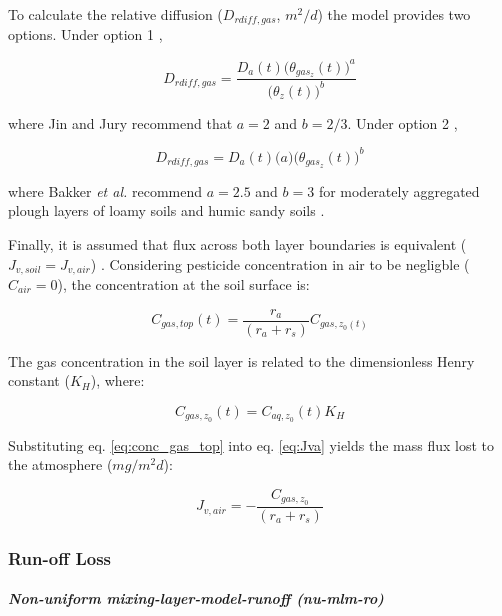 \documentclass[]{article}
\let\oldparagraph\paragraph
\renewcommand{\paragraph}[1]{\oldparagraph{#1}\mbox{}}
\begin{document}
To calculate the relative diffusion (\(D_{rdiff,gas}\), \(m^2/d\)) the
model provides two options. Under option 1 \citep{Millington1960},

\begin{equation}
D_{rdiff,gas} = \frac{ D_a(t) \Big(\theta_{gas_z}(t)\Big)^a}{ \Big(\theta_z(t) \Big)^b }
\label{eq:d_rdiff1}
\end{equation}

where Jin and Jury \citeyearpar{Jin1996} recommend that \(a=2\) and
\(b=2/3\). Under option 2 \citep{Currie1960},

\begin{equation}
D_{rdiff,gas} = D_a(t) \Big(a\Big) \Big( \theta_{gas_z}(t)  \Big)^b
\label{eq:d_rdiff2}
\end{equation}

where Bakker \textit{et al.} \citeyearpar{Bakker1987} recommend
\(a=2.5\) and \(b=3\) for moderately aggregated plough layers of loamy
soils and humic sandy soils \citep{Leistra2001}.

Finally, it is assumed that flux across both layer boundaries is
equivalent (\(J_{v,soil} = J_{v,air}\)) \citep{Leistra2001}. Considering
pesticide concentration in air to be negligble (\(C_{air} = 0\)), the
concentration at the soil surface is:

\begin{equation}
C_{gas,top}(t) = \frac{r_a}{(r_a + r_s)} C_{gas,z_{0}(t)}
\label{eq:conc_gas_top}
\end{equation}

The gas concentration in the soil layer is related to the dimensionless
Henry constant (\(K_H\)), where:

\begin{equation}
C_{gas,z_0}(t) = C_{aq,z_0}(t) K_H  
\label{eq:henry}
\end{equation}

Substituting eq. \ref{eq:conc_gas_top} into eq. \ref{eq:Jva} yields the
mass flux lost to the atmosphere (\(mg/m^2d\)):

\begin{equation}
J_{v,air} = - \frac{C_{gas,z_0}}{(r_a + r_s)}
\label{eq:Jva_final}
\end{equation}

\subsubsection{Run-off Loss}\label{run-off-loss}

\paragraph{\texorpdfstring{\textit{Non-uniform mixing-layer-model-runoff (nu-mlm-ro)}}{}}\label{section}
\end{document}
